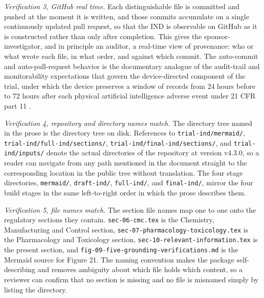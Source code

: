 \textit{Verification 3, GitHub real time.} Each distinguishable file is committed
and pushed at the moment it is written, and those commits accumulate on a single
continuously updated pull request, so that the IND is observable on GitHub as it is
constructed rather than only after completion. This gives the sponsor-investigator,
and in principle an auditor, a real-time view of provenance: who or what wrote each
file, in what order, and against which commit. The auto-commit and
auto-pull-request behavior is the documentary analogue of the audit-trail and
monitorability expectations that govern the device-directed component of the trial,
under which the device preserves a window of records from 24 hours before to 72
hours after each physical artificial intelligence adverse event under 21 CFR part
11 \cite{paiautospons, paisitedocpk}.

\textit{Verification 4, repository and directory names match.} The directory tree
named in the prose is the directory tree on disk. References to
\texttt{trial-ind/mermaid/}, \texttt{trial-ind/full-ind/sections/},
\texttt{trial-ind/final-ind/sections/}, and \texttt{trial-ind/inputs/} denote the
actual directories of the repository at version v4.3.0, so a reader can navigate
from any path mentioned in the document straight to the corresponding location in
the public tree without translation. The four stage directories, \texttt{mermaid/},
\texttt{draft-ind/}, \texttt{full-ind/}, and \texttt{final-ind/}, mirror the four
build stages in the same left-to-right order in which the prose describes them.

\textit{Verification 5, file names match.} The section file names map one to one
onto the regulatory sections they contain. \texttt{sec-06-cmc.tex} is the
Chemistry, Manufacturing and Control section, \texttt{sec-07-pharmacology-toxicology.tex}
is the Pharmacology and Toxicology section, \texttt{sec-10-relevant-information.tex}
is the present section, and \texttt{fig-09-five-grounding-verifications.md} is the
Mermaid source for Figure 21. The naming convention makes the package
self-describing and removes ambiguity about which file holds which content, so a
reviewer can confirm that no section is missing and no file is misnamed simply by
listing the directory.

